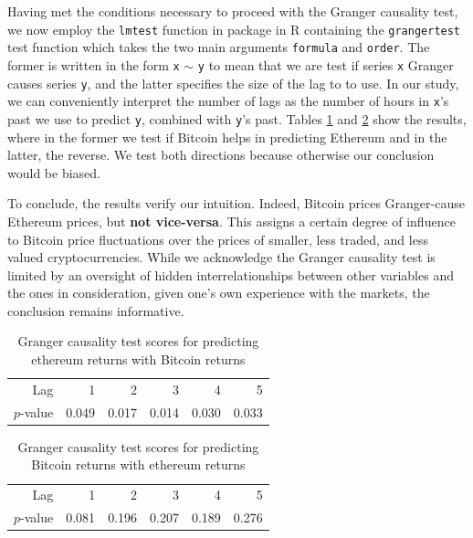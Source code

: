 \documentclass[twoside]{report}
\newcommand{\code}{\texttt}
\begin{document}
\begin{spacing}{1}
Having met the conditions necessary to proceed with the Granger causality test, we now employ the \code{lmtest} function in package in R containing the \code{grangertest} test function which takes the two main arguments \code{formula} and \code{order}. The former is written in the form \code{x} $\sim$ \code{y} to mean that we are test if series \code{x} Granger causes series \code{y}, and the latter specifies the size of the lag to to use. In our study, we can conveniently interpret the number of lags as the number of hours in \code{x}'s past we use to predict \code{y}, combined with \code{y}'s past. Tables \ref{tab:btc_cause_eth} and \ref{tab:eth_cause_btc} show the results, where in the former we test if Bitcoin helps in predicting Ethereum and in the latter, the reverse. We test both directions because otherwise our conclusion would be biased. 

To conclude, the results verify our intuition. Indeed, Bitcoin prices Granger-cause Ethereum prices, but \textbf{not vice-versa}. This assigns a certain degree of influence to Bitcoin price fluctuations over the prices of smaller, less traded, and less valued cryptocurrencies. While we acknowledge the Granger causality test is limited by an oversight of hidden interrelationships between other variables and the ones in consideration, given one's own experience with the markets, the conclusion remains informative.    

\begin{table}[!htbp]
\centering
\begin{tabular}{rrrrrr}
  \hline
 Lag & 1 & 2 & 3 & 4 & 5 \\ 
  $p$-value & 0.049 & 0.017 & 0.014 & 0.030 & 0.033 \\ 
   \hline
\end{tabular}
\caption{Granger causality test scores for predicting ethereum returns with Bitcoin returns} \label{tab:btc_cause_eth}
\end{table}

\begin{table}[!htbp]
\centering
\begin{tabular}{rrrrrr}
  \hline
 Lag & 1 & 2 & 3 & 4 & 5 \\ 
  $p$-value & 0.081 & 0.196 & 0.207 & 0.189 & 0.276 \\ 
   \hline
\end{tabular}
\caption{Granger causality test scores for predicting Bitcoin returns with ethereum returns} \label{tab:eth_cause_btc}
\end{table}


\end{spacing}
\end{document}
